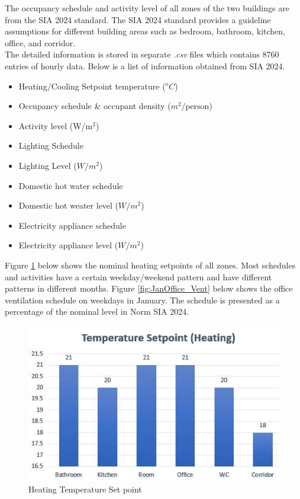 \documentclass[a4paper, oneside]{discothesis}
\begin{document}
		The occupancy schedule and activity level of all zones of the two buildings are from the SIA 2024 standard. The SIA 2024 standard provides a guideline assumptions for different building areas such as bedroom, bathroom, kitchen, office, and corridor.\\

		The detailed information is stored in separate .\textit{csv} files which contains 8760 entries of hourly data. Below is a list of information obtained from SIA 2024.

	\begin{itemize}
		\item Heating/Cooling Setpoint temperature ($^oC$)
		\item Occupancy schedule \& occupant density ($m^2/\text{person}$)
		\item Activity level (W/m$^2$)
		\item Lighting Schedule
		\item Lighting Level ($W/m^2$)
		\item Domestic hot water schedule 
		\item Domestic hot weater level ($W/m^2$)
		\item Electricity appliance schedule
		\item Electricity appliance level ($W/m^2$)
	\end{itemize}


		Figure \ref{fig:HeatingSP} below shows the nominal heating setpoints of all zones. Most schedules and activities have a certain weekday/weekend pattern and have different patterns in different months. Figure \ref{fig:JanOffice_Vent} below shows the office ventilation schedule on weekdays in January. The schedule is presented as a percentage of the nominal level in Norm SIA 2024.\\
		
		\begin{figure}[H]
		\centering
		\includegraphics[scale=1.1]{TempSetpoint.jpg}
		\caption{Heating Temperature Set point}
		\label{fig:HeatingSP}
		\end{figure}
		
\end{document}
